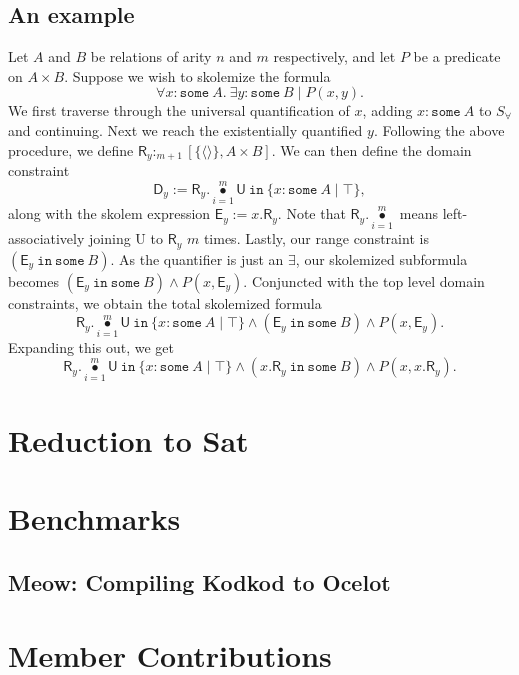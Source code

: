 \documentclass{article}
\theoremstyle{definition}
\DeclareMathOperator{\bigdot}{\bullet}
\begin{document}
    \subsection{An example}
    Let $A$ and $B$ be relations of arity $n$ and $m$ respectively, and let $P$ be a predicate on $A\times B$. Suppose we wish to skolemize the formula
    \[\forall x : \texttt{some}\: A. \: \exists y : \texttt{some}\: B \mid P(x,y).\]
    We first traverse through the universal quantification of $x$, adding $x : \texttt{some}\: A$ to $S_\forall$ and continuing. Next we reach the existentially quantified $y$. Following the above procedure, we define $\textsf{R}_y :_{m + 1} [\{\langle \rangle\}, A\times B]$. We can then define the domain constraint
    \[\textsf{D}_y := \textsf{R}_y .\bigdot\limits_{i = 1}^m \textsf{U}~\texttt{in}~\{x : \texttt{some}\: A \mid \top\},\]
    along with the skolem expression $\textsf{E}_y := x.\textsf{R}_y$. Note that $\textsf{R}_y .\bigdot\limits_{i = 1}^m$ means left-associatively joining \textsf{U} to $\textsf{R}_y$ $m$ times. Lastly, our range constraint is $(\textsf{E}_y~\texttt{in}~\texttt{some}~B)$. As the quantifier is just an $\exists$, our skolemized subformula becomes $(\textsf{E}_y ~ \texttt{in}~\texttt{some}~B) \land P(x, \textsf{E}_y)$. Conjuncted with the top level domain constraints, we obtain the total skolemized formula
    \[\textsf{R}_y .\bigdot\limits_{i = 1}^m \textsf{U}~\texttt{in}~\{x : \texttt{some}\: A \mid \top\} \land (\textsf{E}_y ~ \texttt{in}~\texttt{some}~B) \land P(x, \textsf{E}_y).\]
    Expanding this out, we get
    \[\textsf{R}_y .\bigdot\limits_{i = 1}^m \textsf{U}~\texttt{in}~\{x : \texttt{some}\: A \mid \top\} \land (x.\textsf{R}_y ~ \texttt{in}~\texttt{some}~B) \land P(x, x.\textsf{R}_y).\]

    \section{Reduction to Sat}

    \section{Benchmarks}

    \subsection{Meow: Compiling Kodkod to Ocelot}

    \section{Member Contributions}
\end{document}
